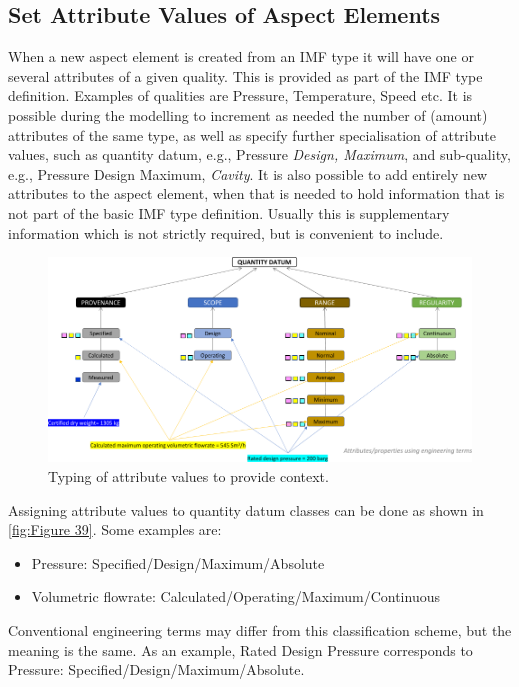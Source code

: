 \documentclass[../main.tex]{subfiles}
\begin{document}
\subsection{Set Attribute Values of Aspect Elements}
When a new aspect element is created from an IMF type it will have one or several
attributes of a given quality. This is provided as part of the IMF type definition. Examples of qualities are
Pressure, Temperature, Speed etc. It is possible during the modelling to increment as needed the number of
(amount) attributes of the same type, as well as specify further specialisation of attribute values, such as quantity
datum, e.g., Pressure \emph{Design, Maximum}, and sub-quality, e.g., Pressure Design Maximum,
\emph{Cavity}. It is also possible to add entirely new attributes to the aspect element, when that is needed to hold information that is not part of the basic IMF type definition. Usually this is supplementary information which is not strictly required, but is convenient to include.

\begin{figure}[htb]
  \centering
  \includegraphics[width=1\textwidth]{img/IMFmanual-img058.png}
  \caption{Typing of attribute values to provide context.}
  \label{fig:Figure 39}
\end{figure}

Assigning attribute values to quantity datum classes can be done as shown in \autoref{fig:Figure 39}. Some examples are:

\begin{itemize}
  \item Pressure: Specified/Design/Maximum/Absolute
  \item Volumetric flowrate: Calculated/Operating/Maximum/Continuous
\end{itemize}
Conventional engineering terms may differ from this classification scheme, but the meaning is the same. As an example,
Rated Design Pressure corresponds to Pressure: Specified/Design/Maximum/Absolute.
\end{document}
